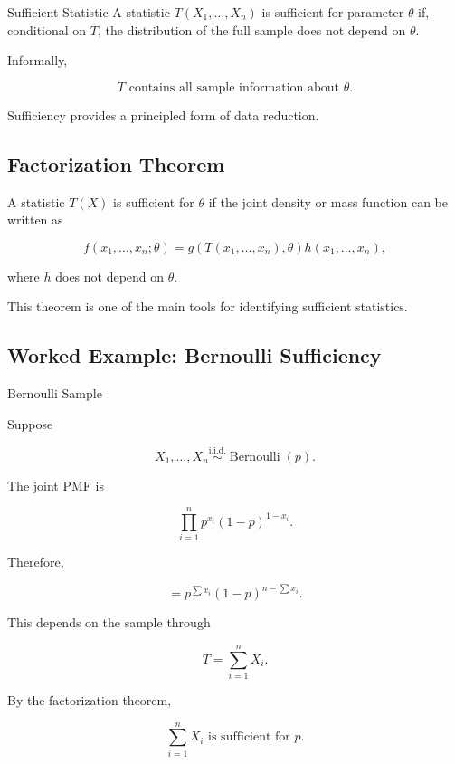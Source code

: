 \begin{definitionbox}{Sufficient Statistic}
A statistic \(T(X_1,\ldots,X_n)\) is sufficient for parameter \(\theta\)
if, conditional on \(T\), the distribution of the full sample does not
depend on \(\theta\).
\end{definitionbox}

Informally,

\[
\boxed{
T
\text{ contains all sample information about }\theta.
}
\]

Sufficiency provides a principled form of data reduction.

\subsection{Factorization Theorem}
\label{subsec:factorization-theorem}

\begin{theorem}
A statistic \(T(X)\) is sufficient for \(\theta\) if the joint density or
mass function can be written as

\[
\boxed{
f(x_1,\ldots,x_n;\theta)
=
g(T(x_1,\ldots,x_n),\theta)
h(x_1,\ldots,x_n),
}
\]

where \(h\) does not depend on \(\theta\).
\end{theorem}

This theorem is one of the main tools for identifying sufficient
statistics.

\subsection{Worked Example: Bernoulli Sufficiency}
\label{subsec:worked-bernoulli-sufficiency}

\begin{workedexamplebox}{Bernoulli Sample}

Suppose

\[
X_1,\ldots,X_n
\overset{\text{i.i.d.}}{\sim}
\operatorname{Bernoulli}(p).
\]

The joint PMF is

\[
\prod_{i=1}^{n}
p^{x_i}(1-p)^{1-x_i}.
\]

Therefore,

\[
=
p^{\sum x_i}
(1-p)^{n-\sum x_i}.
\]

This depends on the sample through

\[
T
=
\sum_{i=1}^{n}X_i.
\]

By the factorization theorem,

\begin{answerbox}
\[
\boxed{
\sum_{i=1}^{n}X_i
\text{ is sufficient for }p.
}
\]
\end{answerbox}

\end{workedexamplebox}


